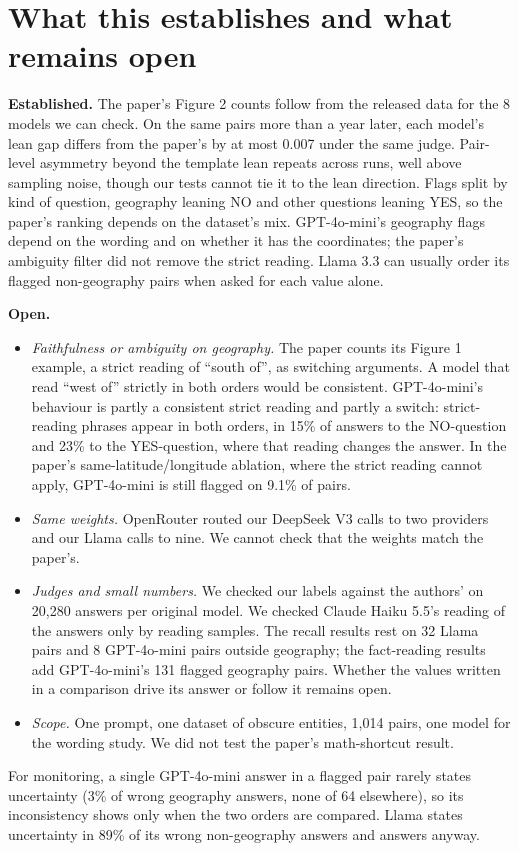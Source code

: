\documentclass[10pt]{article}
\begin{document}
\section{What this establishes and what remains open}
\textbf{Established.} The paper's Figure 2 counts follow from the released data for the 8 models we can check. On the same pairs more than a year later, each model's lean gap differs from the paper's by at most 0.007 under the same judge. Pair-level asymmetry beyond the template lean repeats across runs, well above sampling noise, though our tests cannot tie it to the lean direction. Flags split by kind of question, geography leaning NO and other questions leaning YES, so the paper's ranking depends on the dataset's mix. GPT-4o-mini's geography flags depend on the wording and on whether it has the coordinates; the paper's ambiguity filter did not remove the strict reading. Llama 3.3 can usually order its flagged non-geography pairs when asked for each value alone.

\textbf{Open.}
\begin{itemize}
\item \emph{Faithfulness or ambiguity on geography.} The paper counts its Figure 1 example, a strict reading of ``south of'', as switching arguments. A model that read ``west of'' strictly in both orders would be consistent. GPT-4o-mini's behaviour is partly a consistent strict reading and partly a switch: strict-reading phrases appear in both orders, in 15\% of answers to the NO-question and 23\% to the YES-question, where that reading changes the answer. In the paper's same-latitude/longitude ablation, where the strict reading cannot apply, GPT-4o-mini is still flagged on 9.1\% of pairs.
\item \emph{Same weights.} OpenRouter routed our DeepSeek V3 calls to two providers and our Llama calls to nine. We cannot check that the weights match the paper's.
\item \emph{Judges and small numbers.} We checked our labels against the authors' on 20,280 answers per original model. We checked Claude Haiku 5.5's reading of the answers only by reading samples. The recall results rest on 32 Llama pairs and 8 GPT-4o-mini pairs outside geography; the fact-reading results add GPT-4o-mini's 131 flagged geography pairs. Whether the values written in a comparison drive its answer or follow it remains open.
\item \emph{Scope.} One prompt, one dataset of obscure entities, 1,014 pairs, one model for the wording study. We did not test the paper's math-shortcut result.
\end{itemize}
For monitoring, a single GPT-4o-mini answer in a flagged pair rarely states uncertainty (3\% of wrong geography answers, none of 64 elsewhere), so its inconsistency shows only when the two orders are compared. Llama states uncertainty in 89\% of its wrong non-geography answers and answers anyway.
\end{document}
